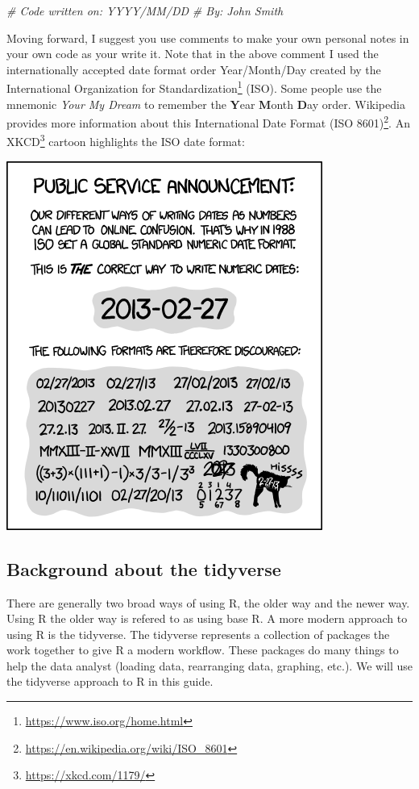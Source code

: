 \documentclass[
]{krantz}
\makeatletter
\newenvironment{Shaded}{\begin{snugshade}}{\end{snugshade}}
\newcommand{\CommentTok}[1]{\textcolor[rgb]{0.37,0.37,0.37}{\textit{#1}}}
\renewcommand{\href}[2]{#2\footnote{\url{#1}}}
\newenvironment{kframe}{%
\medskip{}
\setlength{\fboxsep}{.8em}
 \def\at@end@of@kframe{}%
 \ifinner\ifhmode%
  \def\at@end@of@kframe{\end{minipage}}%
  \begin{minipage}{\columnwidth}%
 \fi\fi%
 \def\FrameCommand##1{\hskip\@totalleftmargin \hskip-\fboxsep
 \colorbox{shadecolor}{##1}\hskip-\fboxsep
     \hskip-\linewidth \hskip-\@totalleftmargin \hskip\columnwidth}%
 \MakeFramed {\advance\hsize-\width
   \@totalleftmargin\z@ \linewidth\hsize
   \@setminipage}}%
 {\par\unskip\endMakeFramed%
 \at@end@of@kframe}
\renewenvironment{Shaded}{\begin{kframe}}{\end{kframe}}
\makeatother
\begin{document}
\begin{Shaded}
\begin{Highlighting}[]
\CommentTok{# Code written on: YYYY/MM/DD }
\CommentTok{# By: John Smith}
\end{Highlighting}
\end{Shaded}

Moving forward, I suggest you use comments to make your own personal notes in your own code as your write it. Note that in the above comment I used the internationally accepted date format order Year/Month/Day created by the \href{https://www.iso.org/home.html}{International Organization for Standardization} (ISO). Some people use the mnemonic \emph{Your My Dream} to remember the \textbf{Y}ear \textbf{M}onth \textbf{D}ay order. Wikipedia provides more information about this \href{https://en.wikipedia.org/wiki/ISO_8601}{International Date Format (ISO 8601)}. An \href{https://xkcd.com/1179/}{XKCD} cartoon highlights the ISO date format:

\includegraphics[width=0.4\linewidth]{ch_introduction/images/iso8601}

\hypertarget{background-about-the-tidyverse}{%
\subsection{Background about the tidyverse}\label{background-about-the-tidyverse}}

There are generally two broad ways of using R, the older way and the newer way. Using R the older way is refered to as using base R. A more modern approach to using R is the tidyverse. The tidyverse represents a collection of packages the work together to give R a modern workflow. These packages do many things to help the data analyst (loading data, rearranging data, graphing, etc.). We will use the tidyverse approach to R in this guide.
\end{document}
